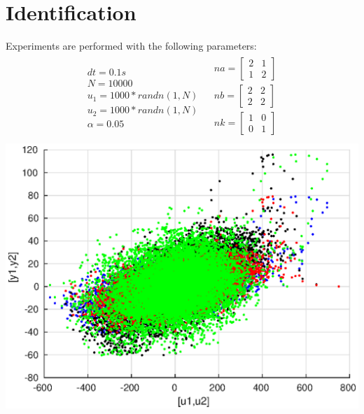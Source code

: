 \documentclass[a4paper]{article}
\begin{document}
\section{Identification}
Experiments are performed with the following parameters: \\
\begin{equation}
\begin{matrix}
\begin{matrix}
	dt = 0.1s \\
	N = 10000 \\
	u_1 = 1000*randn(1,N) \\
	u_2 = 1000*randn(1,N) \\
	\alpha = 0.05
\end{matrix}
&
\begin{matrix}
na = \begin{bmatrix}2 & 1 \\ 1& 2 \end{bmatrix} \\
nb = \begin{bmatrix}2 & 2 \\ 2& 2 \end{bmatrix} \\
nk = \begin{bmatrix}1 & 0 \\ 0& 1 \end{bmatrix} \\
\end{matrix}
\end{matrix}
\end{equation}
\hspace{80pt}
\includegraphics[scale=0.6]{Figures/id_data.eps} \\
\end{document}
